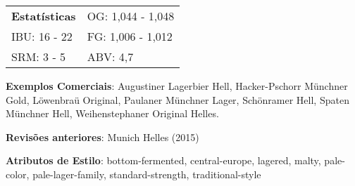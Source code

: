 \begin{tabular}{@{}p{35mm}p{35mm}@{}}
  \textbf{Estatísticas} & OG: 1,044 - 1,048 \\
  IBU: 16 - 22  & FG: 1,006 - 1,012  \\
  SRM: 3 - 5   & ABV: 4,7%
\end{tabular}

\textbf{Exemplos Comerciais}: Augustiner Lagerbier Hell, Hacker-Pschorr Münchner Gold, Löwenbraü Original, Paulaner Münchner Lager, Schönramer Hell, Spaten Münchner Hell, Weihenstephaner Original Helles.

\textbf{Revisões anteriores}: Munich Helles (2015)

\textbf{Atributos de Estilo}: bottom-fermented, central-europe, lagered, malty, pale-color, pale-lager-family, standard-strength, traditional-style

